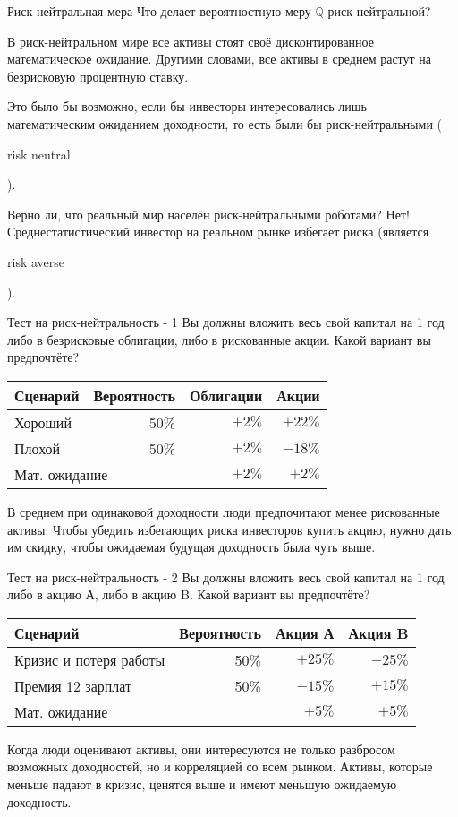 \documentclass{beamer}
\newcommand{\en}[1]{\begin{otherlanguage}{english}#1\end{otherlanguage}}
\begin{document}
\begin{frame}{Риск-нейтральная мера}
\justify
Что делает вероятностную меру $\mathbb{Q}$ риск-нейтральной?

\justify
В риск-нейтральном мире все активы стоят своё дисконтированное математическое ожидание. Другими словами, все активы в среднем растут на безрисковую процентную ставку.

\justify
Это было бы возможно, если бы инвесторы интересовались лишь математическим ожиданием доходности, то есть были бы \alert{риск-нейтральными} (\en{risk neutral}).

\justify
Верно ли, что реальный мир населён риск-нейтральными роботами? Нет! Среднестатистический инвестор на реальном рынке \alert{избегает риска} (является \en{risk averse}).
\end{frame}



\begin{frame}{Тест на риск-нейтральность - 1}
\justify
Вы должны вложить весь свой капитал на 1 год либо в безрисковые облигации, либо в рискованные акции. Какой вариант вы предпочтёте?

\justify
\centering
\begin{tabular}{l|r|r|r}
Сценарий & Вероятность & Облигации & Акции \\ \hline
Хороший  & 50\%   & $+2\%$    & $+22\%$  \\
Плохой   & 50\%   & $+2\%$    & $-18\%$  \\ \hline
\multicolumn{2}{l|}{Мат. ожидание} & $+2\%$ & $+2\%$
\end{tabular}

\pause
\justify
В среднем при одинаковой доходности люди предпочитают менее рискованные активы. Чтобы убедить избегающих риска инвесторов купить акцию, нужно дать им скидку, чтобы ожидаемая будущая доходность была чуть выше.
\end{frame}



\begin{frame}{Тест на риск-нейтральность - 2}
\justify
Вы должны вложить весь свой капитал на 1 год либо в акцию А, либо в акцию B. Какой вариант вы предпочтёте?

\justify
\centering
\begin{tabular}{l|r|r|r}
Сценарий & Вероятность   & Акция А & Акция B \\ \hline
Кризис и потеря работы   & 50\%    & $+25\%$ & $-25\%$  \\
Премия 12 зарплат        & 50\%    & $-15\%$ & $+15\%$  \\ \hline
\multicolumn{2}{l|}{Мат. ожидание} & $+5\%$  & $+5\%$
\end{tabular}

\pause
\justify
Когда люди оценивают активы, они интересуются не только разбросом возможных доходностей, но и корреляцией со всем рынком. Активы, которые меньше падают в кризис, ценятся выше и имеют меньшую ожидаемую доходность.
\end{frame}
\end{document}
